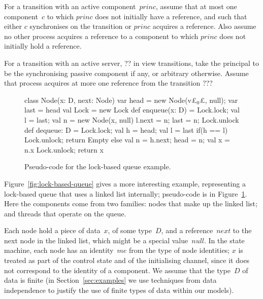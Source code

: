 
For a transition with an active component~$princ$, assume that at most one
component~$c$ to which $princ$ does not initially have a reference, and such
that either $c$ synchronises on the transition or $princ$ acquires a
reference.
%
Also assume no other process acquires a reference to a component to which
$princ$ does not initially hold a reference.  

For a transition with an active server, ?? in view transitions, take the
principal to be the synchronising passive component if any, or arbitrary
otherwise.  Assume that process acquires at more one reference from the
transition ??? 



\begin{figure}
\begin{scala}
class Node(x: D, next: Node)
var head = new Node(v£$_0$£, null); var last = head
val Lock = new Lock
def enqueue(x: D) = {
  Lock.lock; val l = last; val n = new Node(x, null) 
  l.next = n; last = n; Lock.unlock
}
def dequeue: D = {
  Lock.lock; val h = head; val l = last
  if(h == l){ Lock.unlock; return Empty }
  else{ val n = h.next; head = n; val x = n.x
        Lock.unlock; return x }
}
\end{scala}
\caption{Pseudo-code for the lock-based queue example.}
\label{fig:lock-based-queue-pseudocode}
\end{figure}


Figure~\ref{fig:lock-based-queue} gives a more interesting example,
representing a lock-based queue that uses a linked list internally;
pseudo-code is in Figure~\ref{fig:lock-based-queue-pseudocode}.  Here the
components come from two families: nodes that make up the linked list; and
threads that operate on the queue.  

Each node hold a piece of data~$x$, of some type~$D$, and a reference~$next$
to the next node in the linked list, which might be a special value~$null$.
In the state machine, each node has an identity~$me$ from the type of node
identities; $x$ is treated as part of the control state and of the
initialising channel, since it does not correspond to the identity of a
component.  We assume that the type~$D$ of data is finite (in
Section~\ref{sec:examples} we use techniques from data independence to justify
the use of finite types of data within our models).

